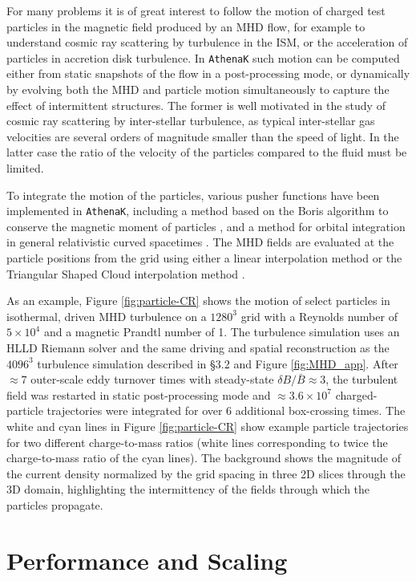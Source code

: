 \documentclass[twocolumn, floatfix]{aastex63}
\newcommand{\ak}{\texttt{AthenaK}}
\begin{document}
For many problems it is of great interest to follow the motion of charged test particles in the magnetic field produced by an MHD flow, for example to understand cosmic ray scattering by turbulence in the ISM, or the acceleration of particles in accretion disk turbulence.  In \ak{} such motion can be computed either from static snapshots of the flow in a post-processing mode, or dynamically by evolving both the MHD and particle motion simultaneously to capture the effect of intermittent structures. The former is well motivated in the study of cosmic ray scattering by inter-stellar turbulence, as typical inter-stellar gas velocities are several orders of magnitude smaller than the speed of light. In the latter case the ratio of the velocity of the particles compared to the fluid must be limited.

To integrate the motion of the particles, various pusher functions have been implemented in \ak{}, including a method based on the Boris algorithm to conserve the magnetic moment of particles \citep{Boris1970}, and a method for orbital integration in general relativistic curved spacetimes \citep{bacchini2019ApJS..240...40B}. The MHD fields are evaluated at the particle positions from the grid using either a linear interpolation method or the Triangular Shaped Cloud interpolation method \citep{BirdsallLangdon1991}. 


As an example, Figure \ref{fig:particle-CR} shows the motion of select particles in isothermal, driven MHD turbulence on a $1280^3$ grid with a Reynolds number of $5 \times 10^4$ and a magnetic Prandtl number of 1. The turbulence simulation uses an HLLD Riemann solver and the same driving and spatial reconstruction as the $4096^3$ turbulence simulation described in \S3.2 and Figure \ref{fig:MHD_app}. After $\approx 7$ outer-scale eddy turnover times with steady-state $\delta B / \bar{B} \approx 3$, the turbulent field was restarted in static post-processing mode and $\approx 3.6 \times 10^7$ charged-particle trajectories were integrated for over 6 additional box-crossing times. The white and cyan lines in Figure \ref{fig:particle-CR} show example particle trajectories for two different charge-to-mass ratios (white lines corresponding to twice the charge-to-mass ratio of the cyan lines). The background shows the magnitude of the current density normalized by the grid spacing in three 2D slices through the 3D domain, highlighting the intermittency of the fields through which the particles propagate. 

\section{Performance and Scaling}
\end{document}
